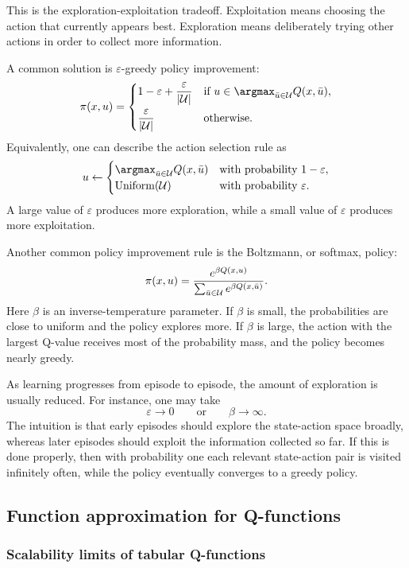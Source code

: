 This is the exploration-exploitation tradeoff. Exploitation means choosing the action that
currently appears best. Exploration means deliberately trying other actions in order to collect
more information.

A common solution is \(\varepsilon\)-greedy policy improvement:
\[
\pi(x,u)
=
\begin{cases}
1-\varepsilon+\dfrac{\varepsilon}{|\cU|}
&
\text{if } u\in\argmax_{\bar u\in\cU}Q(x,\bar u),\\[3mm]
\dfrac{\varepsilon}{|\cU|}
&
\text{otherwise}.
\end{cases}
\]
Equivalently, one can describe the action selection rule as
\[
u
\leftarrow
\begin{cases}
\argmax_{\bar u\in\cU}Q(x,\bar u)
&
\text{with probability }1-\varepsilon,\\
\text{Uniform}(\cU)
&
\text{with probability }\varepsilon.
\end{cases}
\]
A large value of \(\varepsilon\) produces more exploration, while a small value of
\(\varepsilon\) produces more exploitation.

Another common policy improvement rule is the Boltzmann, or softmax, policy:
\[
\pi(x,u)
=
\frac{e^{\beta Q(x,u)}}{\sum_{\bar u\in\mathcal{U}}e^{\beta Q(x,\bar u)}}.
\]
Here \(\beta\) is an inverse-temperature parameter. If \(\beta\) is small, the probabilities are
close to uniform and the policy explores more. If \(\beta\) is large, the action with the largest
Q-value receives most of the probability mass, and the policy becomes nearly greedy.

As learning progresses from episode to episode, the amount of exploration is usually reduced.
For instance, one may take
\[
\varepsilon\to 0
\qquad\text{or}\qquad
\beta\to\infty.
\]
The intuition is that early episodes should explore the state-action space broadly, whereas later
episodes should exploit the information collected so far. If this is done properly, then with
probability one each relevant state-action pair is visited infinitely often, while the policy
eventually converges to a greedy policy.

\subsection{Function approximation for Q-functions}

\subsubsection{Scalability limits of tabular Q-functions}

